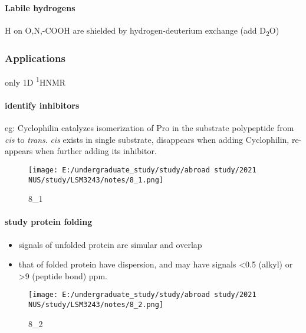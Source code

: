 \documentclass[]{article}
\let\oldparagraph\paragraph
\renewcommand{\paragraph}[1]{\oldparagraph{#1}\mbox{}}
\begin{document}
\hypertarget{labile-hydrogens}{%
\paragraph{Labile hydrogens}\label{labile-hydrogens}}

H on O,N,-COOH are shielded by hydrogen-deuterium exchange (add
D\textsubscript{2}O)

\hypertarget{applications-1}{%
\subsubsection{Applications}\label{applications-1}}

only 1D \textsuperscript{1}HNMR

\hypertarget{identify-inhibitors}{%
\paragraph{identify inhibitors}\label{identify-inhibitors}}

eg: Cyclophilin catalyzes isomerization of Pro in the substrate
polypeptide from \emph{cis} to \emph{trans}. \emph{cis} exists in single
substrate, disappears when adding Cyclophilin, re-appears when further
adding its inhibitor.

\begin{figure}
\centering
\texttt{[image: E:/undergraduate\_study/study/abroad study/2021 NUS/study/LSM3243/notes/8\_1.png]}
\caption{8\_1}
\end{figure}

\hypertarget{study-protein-folding}{%
\paragraph{study protein folding}\label{study-protein-folding}}

\begin{itemize}
\item
  signals of unfolded protein are simular and overlap
\item
  that of folded protein have dispersion, and may have signals
  \textless{}0.5 (alkyl) or \textgreater{}9 (peptide bond) ppm.
\end{itemize}

\begin{figure}
\centering
\texttt{[image: E:/undergraduate\_study/study/abroad study/2021 NUS/study/LSM3243/notes/8\_2.png]}
\caption{8\_2}
\end{figure}
\end{document}
